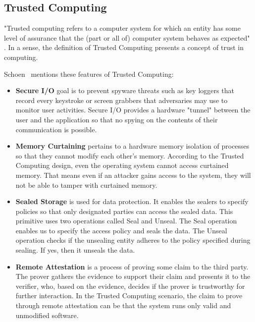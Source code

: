 \subsection{Trusted Computing}\label{sec:tc}
"Trusted computing refers to a computer system for which an entity has some level of assurance that the (part or all of) computer system behaves as expected" \cite{mitchell2005trusted}. In a sense, the definition of Trusted Computing presents a concept of trust in computing.

Schoen~\cite{schoen2003trusted} mentions these features of Trusted Computing:

\begin{itemize}


\item \textbf{Secure I/O} goal is to prevent spyware threats such as key loggers that record every keystroke or screen grabbers that adversaries may use to monitor user activities. Secure I/O provides a hardware "tunnel" between the user and the application so that no spying on the contents of their communication is possible.

\item \textbf{Memory Curtaining} pertains to a hardware memory isolation of processes so that they cannot modify each other's memory. According to the Trusted Computing design, even the operating system cannot access curtained memory. That means even if an attacker gains access to the system, they will not be able to tamper with curtained memory.

\item \textbf{Sealed Storage} is used for data protection. It enables the sealers to specify policies so that only designated parties can access the sealed data. This primitive uses two operations called Seal and Unseal. The Seal operation enables us to specify the access policy and seals the data. The Unseal operation checks if the unsealing entity adheres to the policy specified during sealing. If yes, then it unseals the data.

\item \textbf{Remote Attestation} is a process of proving some claim to the third party. The prover gathers the evidence to support their claim and presents it to the verifier, who, based on the evidence, decides if the prover is trustworthy for further interaction. In the Trusted Computing scenario, the claim to prove through remote attestation can be that the system runs only valid and unmodified software. 
\end{itemize}


